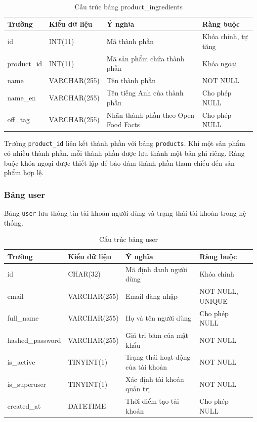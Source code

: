 \begin{table}[H]
	\centering
	\caption{Cấu trúc bảng product\_ingredients}
	\label{tab:product-ingredients}
	\small
	\begin{tabularx}{\textwidth}{|l|l|X|l|}
		\hline
		\textbf{Trường} & \textbf{Kiểu dữ liệu} & \textbf{Ý nghĩa} & \textbf{Ràng buộc} \\
		\hline
		id & INT(11) & Mã thành phần & Khóa chính, tự tăng \\
		\hline
		product\_id & INT(11) & Mã sản phẩm chứa thành phần & Khóa ngoại \\
		\hline
		name & VARCHAR(255) & Tên thành phần & NOT NULL \\
		\hline
		name\_en & VARCHAR(255) & Tên tiếng Anh của thành phần & Cho phép NULL \\
		\hline
		off\_tag & VARCHAR(255) & Nhãn thành phần theo Open Food Facts & Cho phép NULL \\
		\hline
	\end{tabularx}
\end{table}

Trường \texttt{product\_id} liên kết thành phần với bảng \texttt{products}. Khi một sản phẩm có nhiều thành phần, mỗi thành phần được lưu thành một bản ghi riêng. Ràng buộc khóa ngoại được thiết lập để bảo đảm thành phần tham chiếu đến sản phẩm hợp lệ.

\subsubsection{Bảng user}

Bảng \texttt{user} lưu thông tin tài khoản người dùng và trạng thái tài khoản trong hệ thống.

\begin{table}[H]
	\centering
	\caption{Cấu trúc bảng user}
	\label{tab:user}
	\small
	\begin{tabularx}{\textwidth}{|l|l|X|l|}
		\hline
		\textbf{Trường} & \textbf{Kiểu dữ liệu} & \textbf{Ý nghĩa} & \textbf{Ràng buộc} \\
		\hline
		id & CHAR(32) & Mã định danh người dùng & Khóa chính \\
		\hline
		email & VARCHAR(255) & Email đăng nhập & NOT NULL, UNIQUE \\
		\hline
		full\_name & VARCHAR(255) & Họ và tên người dùng & Cho phép NULL \\
		\hline
		hashed\_password & VARCHAR(255) & Giá trị băm của mật khẩu & NOT NULL \\
		\hline
		is\_active & TINYINT(1) & Trạng thái hoạt động của tài khoản & NOT NULL \\
		\hline
		is\_superuser & TINYINT(1) & Xác định tài khoản quản trị & NOT NULL \\
		\hline
		created\_at & DATETIME & Thời điểm tạo tài khoản & Cho phép NULL \\
		\hline
	\end{tabularx}
\end{table}

